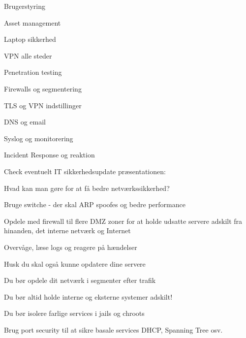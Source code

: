 \documentclass[Screen16to9,17pt]{foils}
\begin{document}
\begin{list2}
\item Brugerstyring
\item Asset management
\item Laptop sikkerhed
\item VPN alle steder
\item Penetration testing
\item Firewalls og segmentering
\item TLS og VPN indstillinger
\item DNS og email
\item Syslog og monitorering
\item Incident Response og reaktion
\end{list2}

Check eventuelt IT sikkerhedsupdate præsentationen:\\
{\small{}}


\begin{list1}
\item Hvad kan man gøre for at få bedre netværkssikkerhed?
\begin{list2}
\item Bruge switche - der skal ARP spoofes og bedre performance
\item Opdele med firewall til flere DMZ zoner for at holde
      udsatte servere adskilt fra hinanden, det interne netværk og
      Internet
\item Overvåge, læse logs og reagere på hændelser
\end{list2}
\item Husk du skal også kunne opdatere dine servere
\end{list1}



\begin{list1}
\item Du bør opdele dit netværk i segmenter efter trafik
\item Du bør altid holde interne og eksterne systemer adskilt!
\item Du bør isolere farlige services i jails og chroots
\item Brug port security til at sikre basale services DHCP, Spanning Tree osv.
\end{list1}
\end{document}
